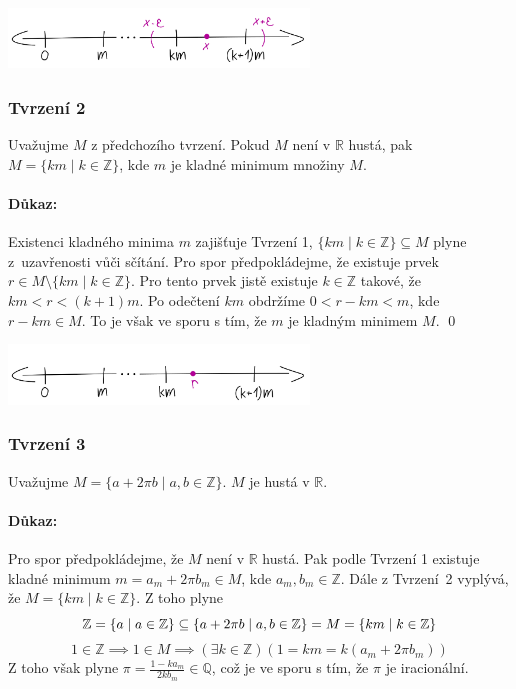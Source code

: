 \documentclass[a4paper]{article}
\begin{document}
\begin{center}
    \includegraphics[height=1.6cm]{1b}
\end{center}

\subsubsection*{Tvrzení 2}

Uvažujme $M$ z předchozího tvrzení. Pokud $M$ není v $\mathbb{R}$ hustá, pak ${M = \{km \mid k \in \mathbb{Z}\}}$, kde $m$ je kladné minimum množiny $M$.

\paragraph*{Důkaz:}
Existenci kladného minima $m$ zajišťuje Tvrzení 1, $\{km \mid k \in \mathbb{Z}\} \subseteq M$ plyne z~uzavřenosti vůči sčítání. Pro spor předpokládejme, že existuje prvek ${r \in M \setminus \{km \mid k \in \mathbb{Z}\}}$. Pro tento prvek jistě existuje $k \in \mathbb{Z}$ takové, že $k m < r < (k + 1) m$. Po odečtení $km$ obdržíme $0 < r - k m < m$, kde $ r - k m \in M$. To je však ve sporu s tím, že $m$ je kladným minimem $M$.
\qed

\begin{center}
    \includegraphics[height=1.6cm]{2}
\end{center}

\subsubsection*{Tvrzení 3}

Uvažujme $M = \{a + 2\pi b \mid a, b \in \mathbb{Z}\}$. $M$ je hustá v $\mathbb{R}$.

\paragraph*{Důkaz:}
Pro spor předpokládejme, že $M$ není v $\mathbb{R}$ hustá. Pak podle Tvrzení 1 existuje kladné minimum $m = a_m + 2\pi b_m \in M$, kde $a_m, b_m \in \mathbb{Z}$. Dále z Tvrzení~2 vyplývá, že $M = \{km \mid k \in \mathbb{Z}\}$. Z toho plyne
\[
    \mathbb{Z} = \{a \mid a \in \mathbb{Z}\}
    \subseteq \{a + 2\pi b \mid a, b \in \mathbb{Z}\}
    = M = \{km \mid k \in \mathbb{Z}\} \\
\]
\[
    1 \in \mathbb{Z}
    \implies 1 \in M
    \implies (\exists k \in \mathbb{Z})(1 = k m = k (a_m + 2\pi b_m))
\]
Z toho však plyne $\pi = \frac{1 - k a_m}{2k b_m} \in \mathbb{Q}$, což je ve sporu s tím, že $\pi$ je iracionální.
\end{document}
